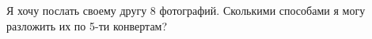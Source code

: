 \question
Я хочу послать своему другу 8 фотографий. Сколькими способами я могу разложить их по 5-ти конвертам?
